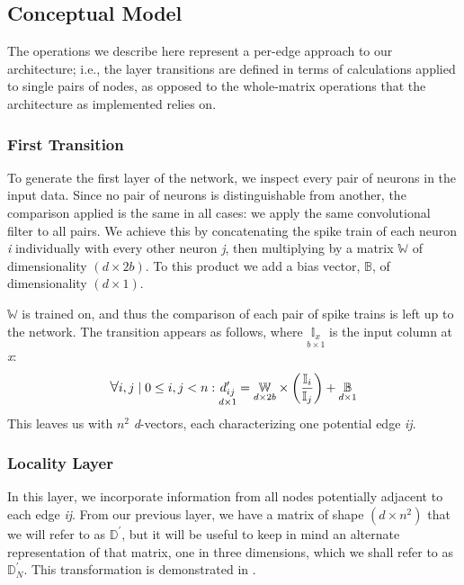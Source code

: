 \subsection{Conceptual Model}
\label{subsec:conceptualmodel}
The operations we describe here represent a per-edge approach to our 
architecture; i.e., the layer transitions are defined in terms of calculations 
applied to single pairs of nodes, as opposed to the whole-matrix operations that 
the architecture as implemented relies on.

\subsubsection{First Transition}
To generate the first layer of the network, we inspect every pair of neurons in 
the input data. Since no pair of neurons is distinguishable from another, the 
comparison applied is the same in all cases: we apply the same convolutional 
filter to all pairs. We achieve this by concatenating the spike train of each 
neuron \textit{i} individually with every other neuron \textit{j}, then 
multiplying by a matrix $\mathbb{W}$ of dimensionality $(d \times 2b)$. To this 
product we add a bias vector, $\mathbb{B}$, of dimensionality $(d \times 1)$.

$\mathbb{W}$ is trained on, and thus the comparison of each pair of spike trains 
is left up to the network. The transition appears as follows, where $\underset{b 
\times 1}{\mathbb{I}_x}$ is the input column at \textit{x}:
\[
	\mathlarger\forall i,j \mid 0 \leq i,j < n: \underset{d \times 
	1}{d_{ij}^\prime} = \underset{d \times 2b}{\mathbb{W}} \times 
	\left(\frac{\mathbb{I}_i}{\mathbb{I}_j}\right) + \underset{d \times 
	1}{\mathbb{B}}
\]
This leaves us with $n^2$ \textit{d}-vectors, each characterizing one potential 
edge \textit{ij}.

\subsubsection{Locality Layer}
\label{subsubsec:locality}
In this layer, we incorporate information from all nodes potentially adjacent to 
each edge \textit{ij}. From our previous layer, we have a matrix of shape $(d 
\times n^2)$ that we will refer to as $\mathbb{D}^{\prime}$, but it will be 
useful to keep in mind an alternate representation of that matrix, one in three 
dimensions, which we shall refer to as $\mathbb{D}_N^{\prime}$. This 
transformation is demonstrated in .

